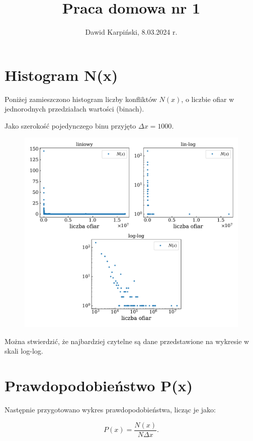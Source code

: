 \documentclass[13pt,a4paper]{article}
\begin{document}
\title{
    \LARGE
    \textbf{Praca domowa nr 1}
}
\author{
    \large
    Dawid Karpiński, 8.03.2024 r.
}
\date{}
\maketitle

\section{Histogram N(x)}

Poniżej zamieszczono histogram liczby konfliktów $N(x)$, o liczbie ofiar w jednorodnych przedziałach wartości (binach).

Jako szerokość pojedynczego binu przyjęto $\Delta{x}=1000$.

\begin{figure}[ht!]
    \centering
    \includegraphics{./hist.pdf}
\end{figure}

Można stwierdzić, że najbardziej czytelne są dane przedstawione na wykresie w skali log-log.


\section{Prawdopodobieństwo P(x)}

Następnie przygotowano wykres prawdopodobieństwa, licząc je jako:

$$
P(x) = \frac{N(x)}{N\Delta{x}}.
$$
\end{document}
